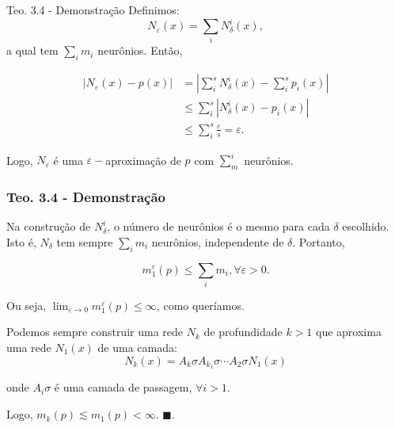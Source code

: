 \documentclass{beamer}
\theoremstyle{definition}
\begin{document}
\begin{frame}{Teo. 3.4 - Demonstração}
    Definimos:
    \begin{equation*}
        N_\varepsilon(x) = \sum_i N^i_\delta(x),
    \end{equation*}
    a qual tem $\sum_i m_i$ neurônios. \pause Então,

    \begin{align*}
        |N_\varepsilon(x) - p(x)| &= |\sum_i^s N^i_\delta(x)-\sum_i^s p_i(x)| \\
        &\leq \sum_i^s |N^i_\delta(x) - p_i(x)| \\
        &\leq \sum_i^s \frac{\varepsilon}{s} = \varepsilon.
    \end{align*}

    \pause

    Logo, $N_\varepsilon$ é uma $\varepsilon-$aproximação de $p$ com $\sum_m^i$ neurônios.
\end{frame}

\begin{frame}
    \frametitle{Teo. 3.4 - Demonstração}

    Na construção de $N_\delta^i$, o número de neurônios é o mesmo para cada $\delta$ escolhido. Isto é, $N_\delta$ tem sempre $\sum_i m_i$ neurônios, independente de $\delta$. \pause Portanto,

    \[
        m_1^\varepsilon(p) \leq \sum_i m_i, \forall \varepsilon>0.
    \]

    \pause
    Ou seja, $\lim_{\varepsilon\to 0} m_1^\varepsilon(p) \leq \infty$, como queríamos.

    \pause

    Podemos sempre construir uma rede $N_k$ de profundidade $k>1$ que aproxima uma rede $N_1(x)$ de uma camada:
    \begin{equation*}
        N_k(x) = A_k \sigma A_{k_1} \sigma \cdots A_2 \sigma N_1(x)
    \end{equation*}

    onde $A_i \sigma$ é uma camada de passagem, $\forall i>1$. \pause 
    
    Logo, $m_k(p)\lesssim m_1(p) < \infty$. $\blacksquare$. 
\end{frame}
\end{document}
